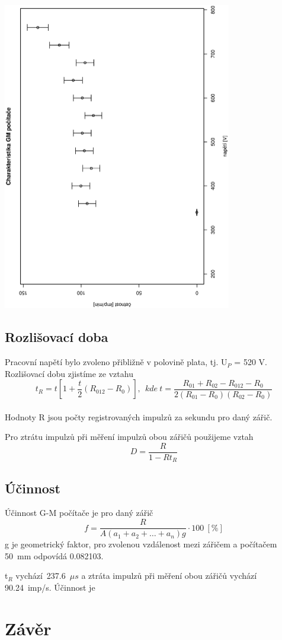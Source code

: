 \documentclass[10pt]{article}
\begin{document}
\begin{center}
\includegraphics[width=10cm,angle=270]{charakteristika.eps}
\end{center}

\subsection{Rozlišovací doba}
Pracovní napětí bylo zvoleno přibližně v polovině plata, tj. U$_P$ = 520 V.
Rozlišovací dobu zjistíme ze vztahu
$$
t_R = t \left[1 + \frac{t}{2} (R_{012} - R_0) \right],~~
kde~t = \frac{R_{01} + R_{02} - R_{012} - R_0}{2(R_{01} - R_0)(R_{02} - R_0)}
$$ \\
Hodnoty R jsou počty registrovaných impulzů za sekundu pro daný zářič.

Pro ztrátu impulzů při měření impulzů obou zářičů použijeme vztah
$$ D = \frac{R}{1 - Rt_R} $$

\subsection{Účinnost}
Účinnost G-M počítače je pro daný zářič
$$f = \frac{R}{A(a_1 + a_2 + \ldots + a_n)g} \cdot 100~[\%]$$
g je geometrický faktor, pro zvolenou vzdálenost mezi zářičem a počítačem 50~mm
odpovídá 0.082103.

t$_R$ vychází~237.6~$\mu s$ a ztráta impulzů při měření obou zářičů vychází
90.24~imp/s. Účinnost je %

\section{Závěr} 
\end{document}
